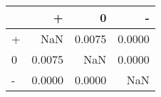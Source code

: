 \begin{tabular}{lrrr}
\toprule
 & + & 0 & - \\
\midrule
+ & NaN & 0.0075 & 0.0000 \\
0 & 0.0075 & NaN & 0.0000 \\
- & 0.0000 & 0.0000 & NaN \\
\bottomrule
\end{tabular}
